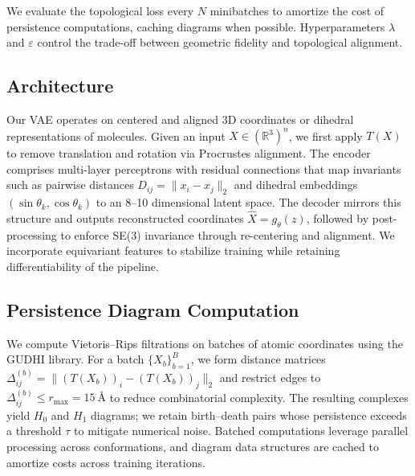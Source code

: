 \documentclass[11pt]{article}
\begin{document}
We evaluate the topological loss every $N$ minibatches to amortize the cost of persistence computations, caching diagrams when possible. Hyperparameters $\lambda$ and $\varepsilon$ control the trade-off between geometric fidelity and topological alignment.

\subsection{Architecture}
Our VAE operates on centered and aligned 3D coordinates or dihedral representations of molecules. Given an input $X \in (\mathbb{R}^3)^n$, we first apply $T(X)$ to remove translation and rotation via Procrustes alignment. The encoder comprises multi-layer perceptrons with residual connections that map invariants such as pairwise distances $D_{ij} = \|x_i - x_j\|_2$ and dihedral embeddings $(\sin \theta_k, \cos \theta_k)$ to an 8--10 dimensional latent space. The decoder mirrors this structure and outputs reconstructed coordinates $\hat{X} = g_\theta(z)$, followed by post-processing to enforce SE(3) invariance through re-centering and alignment. We incorporate equivariant features to stabilize training while retaining differentiability of the pipeline.

\subsection{Persistence Diagram Computation}
We compute Vietoris--Rips filtrations on batches of atomic coordinates using the GUDHI library. For a batch $\{X_b\}_{b=1}^B$, we form distance matrices $\Delta^{(b)}_{ij} = \| (T(X_b))_i - (T(X_b))_j \|_2$ and restrict edges to $\Delta^{(b)}_{ij} \leq r_{\max} = 15~\text{\AA}$ to reduce combinatorial complexity. The resulting complexes yield $H_0$ and $H_1$ diagrams; we retain birth--death pairs whose persistence exceeds a threshold $\tau$ to mitigate numerical noise. Batched computations leverage parallel processing across conformations, and diagram data structures are cached to amortize costs across training iterations.
\end{document}
